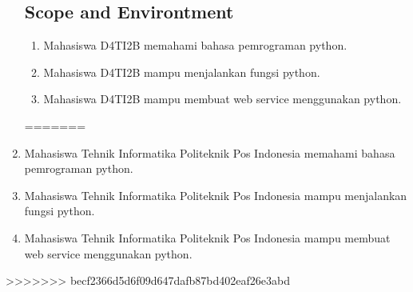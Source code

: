 \begin{enumerate}
\subsection{Scope and Environtment}
	\begin{enumerate}
<<<<<<< HEAD
		\item Mahasiswa D4TI2B memahami bahasa pemrograman python.
		\item Mahasiswa D4TI2B mampu menjalankan fungsi python.
		\item Mahasiswa D4TI2B mampu membuat web service menggunakan python.
	\end{enumerate}
=======
		\item Mahasiswa Tehnik Informatika Politeknik Pos Indonesia memahami bahasa pemrograman python.
		\item Mahasiswa Tehnik Informatika Politeknik Pos Indonesia mampu menjalankan fungsi python.
		\item Mahasiswa Tehnik Informatika Politeknik Pos Indonesia mampu membuat web service menggunakan python.
	\end{enumerate}
>>>>>>> becf2366d5d6f09d647dafb87bd402eaf26e3abd

